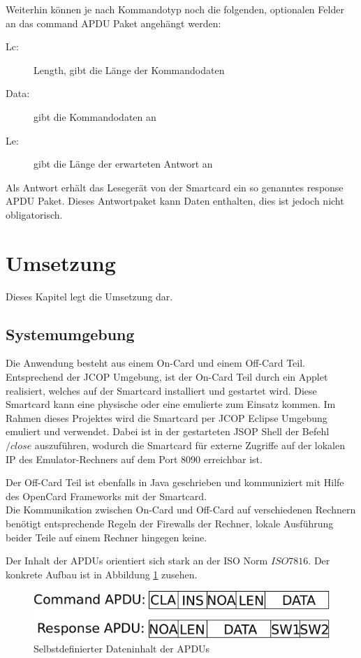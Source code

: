 \documentclass[a4paper,12pt]{scrartcl}
\begin{document}
Weiterhin können je nach Kommandotyp noch die folgenden, optionalen Felder an das command APDU Paket angehängt werden:


\begin{description}
\item[Lc:] Length, gibt die Länge der Kommandodaten
\item[Data:] gibt die Kommandodaten an
\item[Le:] gibt die Länge der erwarteten Antwort an
\end{description}

Als Antwort erhält das Lesegerät von der Smartcard ein so genanntes response APDU Paket. Dieses Antwortpaket kann Daten enthalten, dies ist jedoch nicht obligatorisch. 


\clearpage
\section{Umsetzung}
\label{sec:3}

Dieses Kapitel legt die Umsetzung dar.

\subsection{Systemumgebung}
\label{subsec:3.1}

Die Anwendung besteht aus einem On-Card und einem Off-Card Teil.
Entsprechend der JCOP Umgebung, ist der On-Card Teil durch ein Applet realisiert, welches auf der Smartcard installiert und gestartet wird.
Diese Smartcard kann eine physische oder eine emulierte zum Einsatz kommen.
Im Rahmen dieses Projektes wird die Smartcard per JCOP Eclipse Umgebung emuliert und verwendet.
Dabei ist in der gestarteten JSOP Shell der Befehl $/close$ auszuführen, wodurch die Smartcard für externe  Zugriffe auf der lokalen IP des Emulator-Rechners auf dem Port 8090 erreichbar ist.

Der Off-Card Teil ist ebenfalls in Java geschrieben und kommuniziert mit Hilfe des OpenCard Frameworks mit der Smartcard.
\\

Die Kommunikation zwischen On-Card und Off-Card auf verschiedenen Rechnern benötigt entsprechende Regeln der Firewalls der Rechner, lokale Ausführung beider Teile auf einem Rechner hingegen keine.

Der Inhalt der APDUs orientiert sich stark an der ISO Norm $ISO7816$. Der konkrete Aufbau ist in Abbildung \ref{myapdu} zusehen.

\begin{figure}[htb]
\begin{center}
 \includegraphics[width=1\hsize]{./images/myapdu.png}
\end{center}
\caption[Selbstdefinierter Dateninhalt der APDUs]{\label{myapdu}Selbstdefinierter Dateninhalt der APDUs}
\end{figure}
\end{document}
